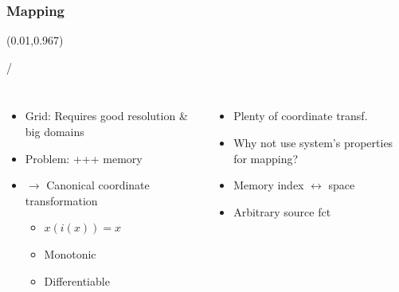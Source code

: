 \documentclass{beamer}
\makeatletter
\newcommand{\framenumber}{
\begin{textblock}{0}(0.01,0.967)
\begin{scriptsize}
{\color{gray}\insertframenumber/\inserttotalframenumber}
\end{scriptsize}
\end{textblock}
}
\newcommand{\pa}[1]{\left( #1 \right)}
\makeatother
\begin{document}
\subsubsection{Mapping}
\begin{frame}{}\framenumber
   \begin{columns}[t]

    \begin{itemize}
        \item Grid: Requires good resolution \& big domains
        \item Problem: +++ memory
        \item $\rightarrow$ Canonical coordinate transformation
        \begin{itemize}
            \item $x\pa{i\pa{x}} = x$
            \item Monotonic
            \item Differentiable
        \end{itemize}
    \end{itemize}

    \begin{itemize}
        \item Plenty of coordinate transf.
        \item Why not use system's properties for mapping?
        \item Memory index $\leftrightarrow$ space
        \item Arbitrary source fct
    \end{itemize}
    \end{columns}
\end{frame}

\end{document}
